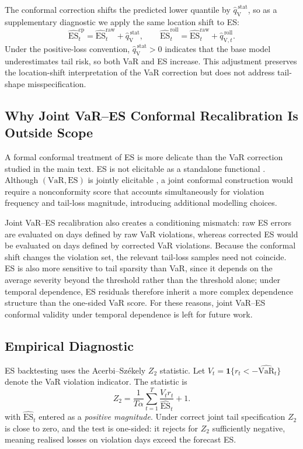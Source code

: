 \documentclass[preprint,11pt,authoryear]{elsarticle}
\newcommand{\VaR}{\mathrm{VaR}}
\newcommand{\ES}{\mathrm{ES}}
\newcommand{\1}{\boldsymbol{1}}
\newcommand{\qVstat}{\hat{q}_{\scriptscriptstyle\mathrm{V}}^{\,\mathrm{stat}}}
\newcommand{\qVroll}{\hat{q}_{{\scriptscriptstyle\mathrm{V}},t}^{\,\mathrm{roll}}}
\begin{document}
The conformal correction shifts the predicted lower quantile by $\qVstat$, so as a supplementary diagnostic we apply the same location shift to ES:
\begin{equation}
	\label{eq:app_es_cp_shift}
	\widehat{\ES}_t^{\mathrm{cp}}
	=
	\widehat{\ES}_t^{\mathrm{raw}}+\qVstat,
	\qquad
	\widehat{\ES}_t^{\mathrm{roll}}
	=
	\widehat{\ES}_t^{\mathrm{raw}}+\qVroll.
\end{equation}
Under the positive-loss convention, $\qVstat>0$ indicates that the base
model underestimates tail risk, so both VaR and ES increase.
This adjustment preserves the location-shift interpretation of the VaR
correction but does not address tail-shape misspecification.

\subsection{Why Joint VaR--ES Conformal Recalibration Is Outside Scope}
\label{app:es_obstacles}

A formal conformal treatment of ES is more delicate than the VaR correction
studied in the main text. ES is not elicitable as a standalone functional
\citep{gneiting2011making}. Although $(\VaR,\ES)$ is jointly elicitable
\citep{fissler2016higher}, a joint conformal construction would require a
nonconformity score that accounts simultaneously for violation frequency and
tail-loss magnitude, introducing additional modelling choices.

Joint VaR--ES recalibration also creates a conditioning mismatch: raw ES
errors are evaluated on days defined by raw VaR violations, whereas corrected
ES would be evaluated on days defined by corrected VaR violations. Because
the conformal shift changes the violation set, the relevant tail-loss samples
need not coincide. ES is also more sensitive to tail sparsity than VaR,
since it depends on the average severity beyond the threshold rather than
the threshold alone; under temporal dependence, ES residuals therefore
inherit a more complex dependence structure than the one-sided VaR score.
For these reasons, joint VaR--ES conformal validity under temporal
dependence is left for future work.

\subsection{Empirical Diagnostic}
\label{app:es_empirical}

ES backtesting uses the Acerbi--Sz\'{e}kely $Z_2$ statistic. Let
$V_t=\mathbf{1}\{r_t<-\widehat{\VaR}_t\}$ denote the VaR violation
indicator. The statistic is
\begin{equation}
	\label{eq:app_z2}
	Z_2
	=
	\frac{1}{T\alpha}
	\sum_{t=1}^{T}
	\frac{V_t r_t}{\widehat{\ES}_t}
	+1 .
\end{equation}
with $\widehat{\ES}_t$ entered as a \emph{positive magnitude}. Under correct
joint tail specification $Z_2$ is close to zero, and the test is one-sided:
it rejects for $Z_2$ sufficiently negative, meaning realised losses on violation
days exceed the forecast ES.
\end{document}
